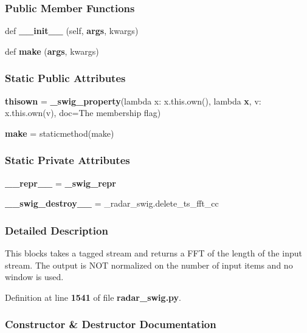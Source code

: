 \subsubsection*{Public Member Functions}
\begin{DoxyCompactItemize}
\item 
def {\bf \+\_\+\+\_\+init\+\_\+\+\_\+} (self, {\bf args}, kwargs)
\item 
def {\bf make} ({\bf args}, kwargs)
\end{DoxyCompactItemize}
\subsubsection*{Static Public Attributes}
\begin{DoxyCompactItemize}
\item 
{\bf thisown} = {\bf \+\_\+swig\+\_\+property}(lambda x\+: x.\+this.\+own(), lambda {\bf x}, v\+: x.\+this.\+own(v), doc=\textquotesingle{}The membership flag\textquotesingle{})
\item 
{\bf make} = staticmethod(make)
\end{DoxyCompactItemize}
\subsubsection*{Static Private Attributes}
\begin{DoxyCompactItemize}
\item 
{\bf \+\_\+\+\_\+repr\+\_\+\+\_\+} = {\bf \+\_\+swig\+\_\+repr}
\item 
{\bf \+\_\+\+\_\+swig\+\_\+destroy\+\_\+\+\_\+} = \+\_\+radar\+\_\+swig.\+delete\+\_\+ts\+\_\+fft\+\_\+cc
\end{DoxyCompactItemize}


\subsubsection{Detailed Description}
\begin{DoxyVerb}This blocks takes a tagged stream and returns a FFT of the length of the input stream. The output is NOT normalized on the number of input items and no window is used.\end{DoxyVerb}
 

Definition at line {\bf 1541} of file {\bf radar\+\_\+swig.\+py}.



\subsubsection{Constructor \& Destructor Documentation}
